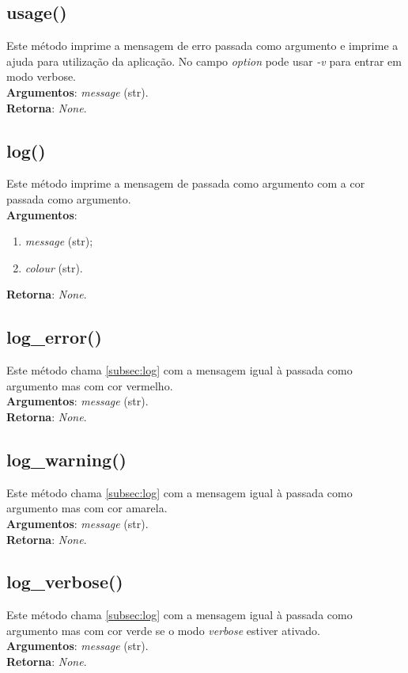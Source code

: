 \documentclass{report}
\begin{document}
\subsection{usage()}
\label{subsec.usage}
Este método imprime a mensagem de erro passada como argumento e imprime a ajuda para utilização da aplicação. No campo \textit{option} pode usar \textit{-v} para entrar em modo verbose.\\ 
\textbf{Argumentos}: \textit{message} (str).\\
\textbf{Retorna}: \textit{None}.

\subsection{log()}
\label{subsec:log}
Este método imprime a mensagem de passada como argumento com a cor passada como argumento.\\ 
\textbf{Argumentos}: 
\begin{enumerate}
\item \textit{message} (str);
\item \textit{colour} (str).
\end{enumerate}
\textbf{Retorna}: \textit{None}.

\subsection{log\_error()}
Este método chama \autoref{subsec:log} com a mensagem igual à passada como argumento mas com cor vermelho.\\ 
\textbf{Argumentos}:
\textit{message} (str).\\
\textbf{Retorna}: \textit{None}.

\subsection{log\_warning()}
Este método chama \autoref{subsec:log} com a mensagem igual à passada como argumento mas com cor amarela.\\ 
\textbf{Argumentos}:
\textit{message} (str).\\
\textbf{Retorna}: \textit{None}.

\subsection{log\_verbose()}
Este método chama \autoref{subsec:log} com a mensagem igual à passada como argumento mas com cor verde se o modo \textit{verbose} estiver ativado.\\ 
\textbf{Argumentos}:
\textit{message} (str).\\
\textbf{Retorna}: \textit{None}.
\end{document}
